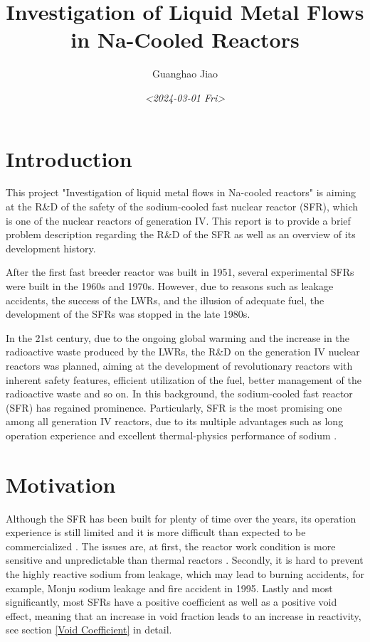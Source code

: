 \documentclass[11pt]{article}
\author{Guanghao Jiao}
\date{\textit{<2024-03-01 Fri>}}
\title{Investigation of Liquid Metal Flows in Na-Cooled Reactors}
\begin{document}
\maketitle
\section{Introduction}
This project "Investigation of liquid metal flows in Na-cooled reactors" is aiming at the R\&D of the safety of the sodium-cooled fast nuclear reactor (SFR), which is one of the nuclear reactors of generation IV. This report is to provide a brief problem description regarding the R\&D of the SFR as well as an overview of its development history.

After the first fast breeder reactor was built in 1951, several experimental SFRs were built in the 1960s and 1970s. However, due to reasons such as leakage accidents, the success of the LWRs, and the illusion of adequate fuel, the development of the SFRs was stopped in the late 1980s. \cite{chengSafetySodiumCooledFast2021}

In the 21st century, due to the ongoing global warming and the increase in the radioactive waste produced by the LWRs, the R\&D on the generation IV nuclear reactors was planned, aiming at the development of revolutionary reactors with inherent safety features, efficient utilization of the fuel, better management of the radioactive waste and so on. In this background, the sodium-cooled fast reactor (SFR) has regained prominence. Particularly, SFR is the most promising one among all generation IV reactors, due to its multiple advantages such as long operation experience and excellent thermal-physics performance of sodium \cite{ chengSafetySodiumCooledFast2021, TechnologyRoadmapUpdate, schulenbergFourthGenerationNuclear2022}.

\section{Motivation}
\label{motivation}
Although the SFR has been built for plenty of time over the years, its operation experience is still limited and it is more difficult than expected to be commercialized \cite{chengSafetySodiumCooledFast2021}. The issues are, at first, the reactor work condition is more sensitive and unpredictable than thermal reactors \cite{zohuriThermodynamicsNuclearPower2019}. Secondly, it is hard to prevent the highly reactive sodium from leakage, which may lead to burning accidents, for example, Monju sodium leakage and fire accident in 1995. Lastly and most significantly, most SFRs have a positive coefficient as well as a positive void effect, meaning that an increase in void fraction leads to an increase in reactivity, see section \ref{Void Coefficient} in detail.
\end{document}
